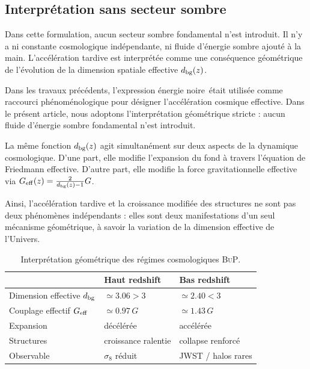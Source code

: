 \documentclass[11pt]{article}
\newcommand{\Geff}{G_{\rm eff}}
\newcommand{\sig}{\sigma_8}
\newcommand{\BuP}{\textsc{BuP}}
\begin{document}
\subsection{Interpr\'etation sans secteur sombre}

Dans cette formulation, aucun secteur sombre fondamental n'est introduit. Il n'y a ni
constante cosmologique ind\'ependante, ni fluide d'\'energie sombre ajout\'e \`a la main.
L'acc\'el\'eration tardive est interpr\'et\'ee comme une cons\'equence g\'eom\'etrique
de l'\'evolution de la dimension spatiale effective $d_{\rm bg}(z)$.

Dans les travaux pr\'ec\'edents, l'expression \og\'energie noire\fg\ \'etait utilis\'ee
comme raccourci ph\'enom\'enologique pour d\'esigner l'acc\'el\'eration cosmique effective.
Dans le pr\'esent article, nous adoptons l'interpr\'etation g\'eom\'etrique stricte :
aucun fluide d'\'energie sombre fondamental n'est introduit.

La m\^eme fonction $d_{\rm bg}(z)$ agit simultan\'ement sur deux aspects de la
dynamique cosmologique. D'une part, elle modifie l'expansion du fond \`a travers
l'\'equation de Friedmann effective. D'autre part, elle modifie la force gravitationnelle
effective via $\Geff(z)=\frac{2}{d_{\rm bg}(z)-1}G$.

Ainsi, l'acc\'el\'eration tardive et la croissance modifi\'ee des structures ne sont pas
deux ph\'enom\`enes ind\'ependants : elles sont deux manifestations d'un seul m\'ecanisme
g\'eom\'etrique, \`a savoir la variation de la dimension effective de l'Univers.

\begin{table}[htbp]
\centering
\caption{Interpr\'etation g\'eom\'etrique des r\'egimes cosmologiques \BuP.}
\label{tab:regimes}
\smallskip
\begin{tabular}{lll}
\toprule
 & Haut redshift & Bas redshift \\
\midrule
Dimension effective $d_{\rm bg}$ & $\simeq 3.06>3$ & $\simeq 2.40<3$ \\
Couplage effectif $\Geff$ & $\simeq 0.97\,G$ & $\simeq 1.43\,G$ \\
Expansion & d\'ec\'el\'er\'ee & acc\'el\'er\'ee \\
Structures & croissance ralentie & collapse renforc\'e \\
Observable & $\sig$ r\'eduit & JWST / halos rares \\
\bottomrule
\end{tabular}
\end{table}
\end{document}
